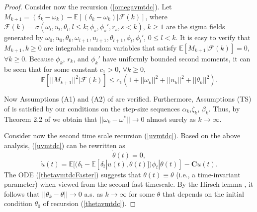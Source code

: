 \begin{proof}
Consider now the recursion (\ref{omegavmtdc}).
Let
$M_{k+1}=(\delta_k-\omega_k)
-\mathbb{E}[(\delta_k-\omega_k)|\mathcal{F}(k)]$,
where $\mathcal{F}(k)=\sigma(\omega_l,{u}_l,{\theta}_l,l\leq k;{\phi}_s,{\phi}_s',r_s,s<k)$, 
$k\geq 1$ are the sigma fields
generated by $\omega_0,u_0,{\theta}_0,\omega_{l+1},{u}_{l+1},{\theta}_{l+1},{\phi}_l,{\phi}_l'$,
$0\leq l<k$.
It is easy to verify that $M_{k+1},k\geq0$ are integrable random variables that 
satisfy $\mathbb{E}[M_{k+1}|\mathcal{F}(k)]=0$, $\forall k\geq0$.
Because ${\phi}_k$, $r_k$, and ${\phi}_k'$ have
uniformly bounded second moments, it can be seen that for some constant
$c_1>0$, $\forall k\geq0$,
\begin{equation*}
\mathbb{E}[||M_{k+1}||^2|\mathcal{F}(k)]\leq
c_1(1+||\omega_k||^2+||{u}_k||^2+||{\theta}_k||^2).
\end{equation*}


Now Assumptions (A1) and (A2) of \cite{borkar2000ode} are verified.
Furthermore, Assumptions (TS) of \cite{borkar2000ode} is satisfied by our
conditions on the step-size sequences $\alpha_k$,$\zeta_k$, $\beta_k$. Thus,
by Theorem 2.2 of \cite{borkar2000ode} we obtain that
$||\omega_k-\omega^*||\rightarrow 0$ almost surely as $k\rightarrow \infty$.

Consider now the second time scale recursion (\ref{uvmtdc}).
Based on the above analysis, (\ref{uvmtdc}) can be rewritten as
\begin{equation}
 \dot{{\theta}}(t) = 0,
    \label{thetavmtdcFaster}
\end{equation}
\begin{equation}
 \dot{u}(t) = \mathbb{E}[(\delta_t-\mathbb{E}[\delta_t|{u}(t),{\theta}(t)]){\phi}_t|{\theta}(t)] - \textbf{C}{u}(t).
    \label{uvmtdcFaster}
\end{equation}
The ODE (\ref{thetavmtdcFaster}) suggests that ${\theta}(t)\equiv {\theta}$ (i.e., a time-invariant parameter)
when viewed from the second fast timescale.
By the Hirsch lemma \cite{hirsch1989convergent}, it follows that
$||{\theta}_k-{\theta}||\rightarrow 0$ a.s. as $k\rightarrow \infty$ for some
${\theta}$ that depends on the initial condition ${\theta}_0$ of recursion
(\ref{thetavmtdc}). 


\end{proof}
